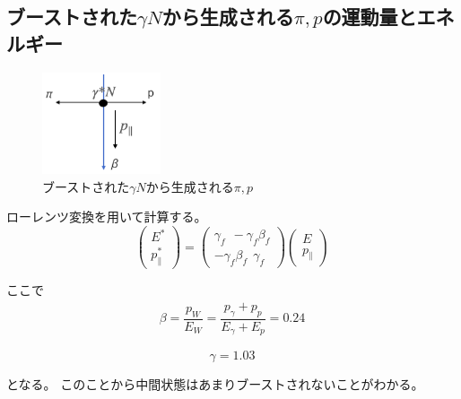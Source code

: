 \subsection{ブーストされた$\gamma N$から生成される$\pi,p$の運動量とエネルギー}
\begin{figure}[H]
    \centering
    \includegraphics[height=3cm]{img/boost_middle_situation.png}
    \caption{ブーストされた$\gamma N$から生成される$\pi,p$}
    \label{fig:angle6}
\end{figure}

ローレンツ変換を用いて計算する。
\begin{equation}
    \left(\begin{array}{c}
        E^* \\
        p^*_\parallel
    \end{array}\right)
    =\left(\begin{array}{cc}
        \gamma_f \ \ -\gamma_f \beta_f \\
        -\gamma_f \beta _f \ \  \gamma_f
    \end{array}\right)
    \left(\begin{array}{c}
        E \\
        p_\parallel
    \end{array}\right)
\end{equation}

ここで
\begin{eqnarray}
    \beta = \dfrac{p_W}{E_W} = \dfrac{p_\gamma + p_p}{E_\gamma + E_p} = 0.24
\end{eqnarray}

\begin{equation}
    \gamma = 1.03
\end{equation}

となる。
このことから中間状態はあまりブーストされないことがわかる。

